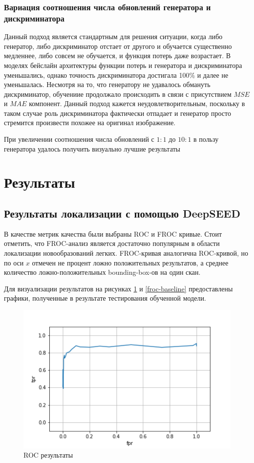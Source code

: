 \subsubsection{Вариация соотношения числа обновлений генератора и дискриминатора}

Данный подход является стандартным для решения ситуации, когда либо генератор, либо дискриминатор отстает от другого и обучается существенно медленнее, либо совсем не обучается, и функция потерь даже возрастает. В моделях бейслайн архитектуры функции потерь и генератора и дискриминатора уменьшались, однако точность дискриминатора достигала 100\% и далее не уменьшалась. Несмотря на то, что генератору не удавалось обмануть дискриминатор, обучениие продолжало происходить в связи с присутствием $MSE$ и $MAE$ компонент. Данный подход кажется неудовлетворительным, поскольку в таком случае роль дискриминатора фактически отпадает и генератор просто стремится произвести похожее на оригинал изображение.

При увеличении соотношения числа обновлений с $1:1$ до $10:1$ в пользу генератора удалось получить визуально лучшие результаты


\section{Результаты}

\subsection{Результаты локализации с помощью DeepSEED}

В качестве метрик качества были выбраны ROC и FROC кривые. Стоит отметить, что FROC-анализ является достаточно популярным в области локализации новообразований легких. FROC-кривая аналогична ROC-кривой, но по оси $x$ отмечен не процент ложно положительных результатов, а среднее количество ложно-положительных bounding-box-ов на один скан.

Для визуализации результатов на рисунках \ref{roc-baseline} и \ref{froc-baseline} предоставлены графики, полученные в результате тестирования обученной модели.

\begin{figure}[!h]
\includegraphics[width=\linewidth]{images/roc.png}
\caption{ROC результаты}\label{roc-baseline}
\centering
\end{figure}

